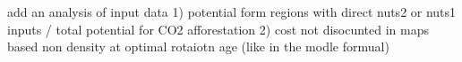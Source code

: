 add an analysis of input data
1) potential form regions with direct nuts2 or nuts1 inputs / total potential for CO2 afforestation
2) cost not disocunted in maps based non density at optimal rotaiotn age (like in the modle formual)